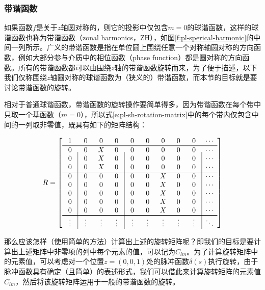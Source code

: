 \subsubsection{带谐函数}
如果函数$f$是关于$z$轴圆对称的，则它的投影中仅包含$m=0$的球谐函数，这样的球谐函数也称为带谐函数（zonal harmonics，ZH），如图\ref{f:pl-sperical-harmonic}的中间一列所示。广义的带谐函数是指在单位圆上围绕任意一个对称轴圆对称的方向函数，例如大部分参与介质中的相位函数（phase function）都是圆对称的方向函数。所有的带谐函数都可以由围绕$z$轴的带谐函数旋转而来，为了便于描述，以下我们仅称围绕$z$轴圆对称的球谐函数为（狭义的）带谐函数，而本节的目标就是要讨论带谐函数的旋转。

相对于普通球谐函数，带谐函数的旋转操作要简单得多，因为带谐函数在每个带中只取一个基函数（$m=0$），所以式\ref{e:pl-sh-rotation-matrix}中的每个带内仅包含中间的一列取非零值，既具有如下的矩阵结构：

\begin{equation}\label{e:pl-zonal-rotation-matrix}
	R=\left[
	\centering
	\begin{array}{c|ccc|ccccc|c}
		\text{ 1 } & \text{ 0 } & \text{ 0 } & \text{ 0 } & \text{ 0 } & \text{ 0 } & \text{ 0 } & \text{ 0 } & \text{ 0 } & \cdots \\
		\hline
		0 & 0 & X & 0 & 0 & 0 & 0 & 0 & 0 & \cdots \\
		0 & 0 & X & 0 & 0 & 0 & 0 & 0 & 0 & \cdots \\
		0 & 0 & X & 0 & 0 & 0 & 0 & 0 & 0 & \cdots \\
		\hline
		0 & 0 & 0 & 0 & 0 & 0 & X & 0 & 0 & \cdots \\
		0 & 0 & 0 & 0 & 0 & 0 & X & 0 & 0 & \cdots \\
		0 & 0 & 0 & 0 & 0 & 0 & X & 0 & 0 & \cdots \\
		0 & 0 & 0 & 0 & 0 & 0 & X & 0 & 0 & \cdots \\
		0 & 0 & 0 & 0 & 0 & 0 & X & 0 & 0 & \cdots \\
		\hline
		\vdots & \vdots & \vdots & \vdots & \vdots & \vdots & \vdots & \vdots & \vdots & \ddots
	\end{array}
	\right]
\end{equation}

那么应该怎样（使用简单的方法）计算出上述的旋转矩阵呢？即我们的目标是要计算出上述矩阵中非零项的列中每个元素的值，可以记为$C_{lm}$。为了计算旋转矩阵中的元素值，可以考虑对一个位置$z=(0,0,1)$处的脉冲函数$\delta(s)$执行旋转，由于脉冲函数具有确定（且简单）的表述形式，我们可以借此来计算旋转矩阵的元素值$C_{lm}$，然后将该旋转矩阵运用于一般的带谐函数的旋转。

